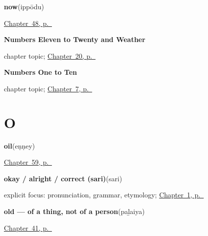 \noindent\begin{minipage}[t]{\linewidth}
\raggedright
\textbf{now}\enspace\emph{}\enspace(ippōdu)\par
\footnotesize \hyperref[ch:ta-setting-out]{Chapter~48, p.~\pageref*{ch:ta-setting-out}}
\end{minipage}\par\smallskip

\noindent\begin{minipage}[t]{\linewidth}
\raggedright
\textbf{Numbers Eleven to Twenty and Weather}\par
\footnotesize chapter topic; \hyperref[ch:ta-numbers-and-weather]{Chapter~20, p.~\pageref*{ch:ta-numbers-and-weather}}
\end{minipage}\par\smallskip

\noindent\begin{minipage}[t]{\linewidth}
\raggedright
\textbf{Numbers One to Ten}\par
\footnotesize chapter topic; \hyperref[ch:ta-numbers-one-to-ten]{Chapter~7, p.~\pageref*{ch:ta-numbers-one-to-ten}}
\end{minipage}\par\smallskip

\section*{O}

\noindent\begin{minipage}[t]{\linewidth}
\raggedright
\textbf{oil}\enspace\emph{}\enspace(eṇṇey)\par
\footnotesize \hyperref[ch:ta-in-the-kitchen]{Chapter~59, p.~\pageref*{ch:ta-in-the-kitchen}}
\end{minipage}\par\smallskip

\noindent\begin{minipage}[t]{\linewidth}
\raggedright
\textbf{okay / alright / correct (sari)}\enspace\emph{}\enspace(sari)\par
\footnotesize explicit focus: pronunciation, grammar, etymology; \hyperref[ch:greetings]{Chapter~1, p.~\pageref*{ch:greetings}}
\end{minipage}\par\smallskip

\noindent\begin{minipage}[t]{\linewidth}
\raggedright
\textbf{old — of a thing, not of a person}\enspace\emph{}\enspace(paḻaiya)\par
\footnotesize \hyperref[ch:ta-describing-things]{Chapter~41, p.~\pageref*{ch:ta-describing-things}}
\end{minipage}\par\smallskip

